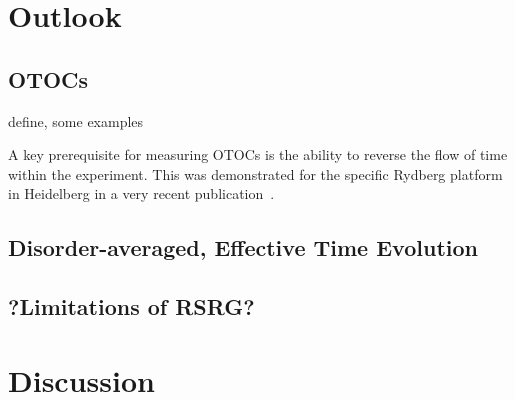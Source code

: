 \chapter{Outlook}
\section{OTOCs}
define, some examples

A key prerequisite for measuring OTOCs is the ability to reverse the flow of time within the experiment. This was demonstrated for the specific Rydberg platform in Heidelberg in a  very recent publication~\cite{geierTimereversalDipolarQuantum2024}.

\cite{muellenbachOTOC}

\section{Disorder-averaged, Effective Time Evolution}


\section{?Limitations of RSRG?}


\chapter{Discussion}
